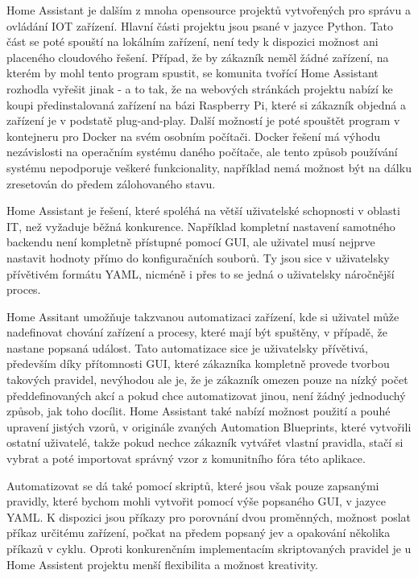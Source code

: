 Home Assistant je dalším z mnoha opensource projektů vytvořených pro správu a ovládání IOT zařízení. Hlavní části projektu jsou psané v jazyce Python. Tato část se poté spouští na lokálním zařízení, není tedy k dispozici možnost ani placeného cloudového řešení. Případ, že by zákazník neměl žádné zařízení, na kterém by mohl tento program spustit, se komunita tvořící Home Assistant rozhodla vyřešit jinak - a to tak, že na webových stránkách projektu nabízí ke koupi předinstalovaná zařízení na bázi Raspberry Pi, které si zákazník objedná a zařízení je v podstatě plug-and-play. Další možností je poté spouštět program v kontejneru pro Docker na svém osobním počítači. Docker řešení má výhodu nezávislosti na operačním systému daného počítače, ale tento způsob používání systému nepodporuje veškeré funkcionality, například nemá možnost být na dálku zresetován do předem zálohovaného stavu.

Home Assistant je řešení, které spoléhá na větší uživatelské schopnosti v oblasti IT, než vyžaduje běžná konkurence. Například kompletní nastavení samotného backendu není kompletně přístupné pomocí GUI, ale uživatel musí nejprve nastavit hodnoty přímo do konfiguračních souborů. Ty jsou sice v uživatelsky přívětivém formátu YAML, nicméně i přes to se jedná o uživatelsky náročnější proces. 

Home Assitant umožňuje takzvanou automatizaci zařízení, kde si uživatel může nadefinovat chování zařízení a procesy, které mají být spuštěny, v případě, že nastane popsaná událost. Tato automatizace sice je uživatelsky přívětivá, především díky přítomnosti GUI, které zákazníka kompletně provede tvorbou takových pravidel, nevýhodou ale je, že je zákazník omezen pouze na nízký počet předdefinovaných akcí a 
pokud chce automatizovat jinou, není žádný jednoduchý způsob, jak toho docílit. Home Assistant také nabízí možnost použití a pouhé upravení jistých vzorů, v originále zvaných Automation Blueprints, které vytvořili ostatní uživatelé, takže pokud nechce zákazník vytvářet vlastní pravidla, stačí si vybrat a poté importovat správný vzor z komunitního fóra této aplikace.

Automatizovat se dá také pomocí skriptů, které jsou však pouze zapsanými pravidly, které bychom mohli vytvořit pomocí výše popsaného GUI, v jazyce YAML. K dispozici jsou příkazy pro porovnání dvou proměnných, možnost poslat příkaz určitému zařízení, počkat na předem popsaný jev a opakování několika příkazů v cyklu. Oproti konkurenčním implementacím skriptovaných pravidel je u Home Assistent projektu menší flexibilita a možnost kreativity.

